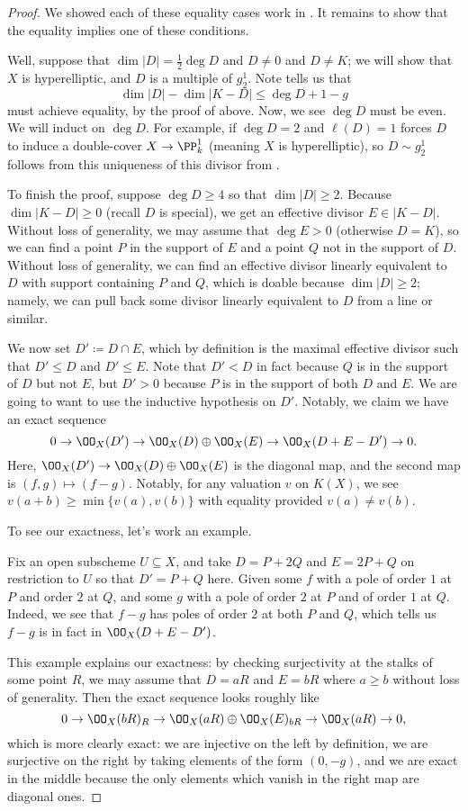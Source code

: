\documentclass[../notes.tex]{subfiles}
\begin{document}
\begin{proof}
	We showed each of these equality cases work in . It remains to show that the equality implies one of these conditions.

	Well, suppose that $\dim|D|=\frac12\deg D$ and $D\ne0$ and $D\ne K$; we will show that $X$ is hyperelliptic, and $D$ is a multiple of $g^1_2$. Note  tells us that
	\[\dim|D|-\dim|K-D|\le\deg D+1-g\]
	must achieve equality, by the proof of  above. Now, we see $\deg D$ must be even. We will induct on $\deg D$. For example, if $\deg D=2$ and $\ell(D)=1$ forces $D$ to induce a double-cover $X\to\PP^1_k$ (meaning $X$ is hyperelliptic), so $D\sim g^1_2$ follows from this uniqueness of this divisor from .

	To finish the proof, suppose $\deg D\ge4$ so that $\dim|D|\ge2$. Because $\dim|K-D|\ge0$ (recall $D$ is special), we get an effective divisor $E\in|K-D|$. Without loss of generality, we may assume that $\deg E>0$ (otherwise $D=K$), so we can find a point $P$ in the support of $E$ and a point $Q$ not in the support of $D$. Without loss of generality, we can find an effective divisor linearly equivalent to $D$ with support containing $P$ and $Q$, which is doable because $\dim|D|\ge2$; namely, we can pull back some divisor linearly equivalent to $D$ from a line or similar.

	We now set $D'\coloneqq D\cap E$, which by definition is the maximal effective divisor such that $D'\le D$ and $D'\le E$. Note that $D'<D$ in fact because $Q$ is in the support of $D$ but not $E$, but $D'>0$ because $P$ is in the support of both $D$ and $E$. We are going to want to use the inductive hypothesis on $D'$. Notably, we claim we have an exact sequence
	\[0\to\OO_X(D')\to\OO_X(D)\oplus\OO_X(E)\to\OO_X(D+E-D')\to0.\]
	Here, $\OO_X(D')\to\OO_X(D)\oplus\OO_X(E)$ is the diagonal map, and the second map is $(f,g)\mapsto(f-g)$. Notably, for any valuation $v$ on $K(X)$, we see $v(a+b)\ge\min\{v(a),v(b)\}$ with equality provided $v(a)\ne v(b)$.

	To see our exactness, let's work an example.
	\begin{example}
		Fix an open subscheme $U\subseteq X$, and take $D=P+2Q$ and $E=2P+Q$ on restriction to $U$ so that $D'=P+Q$ here. Given some $f$ with a pole of order $1$ at $P$ and order $2$ at $Q$, and some $g$ with a pole of order $2$ at $P$ and of order $1$ at $Q$. Indeed, we see that $f-g$ has poles of order $2$ at both $P$ and $Q$, which tells us $f-g$ is in fact in $\OO_X(D+E-D')$.
	\end{example}
	This example explains our exactness: by checking surjectivity at the stalks of some point $R$, we may assume that $D=aR$ and $E=bR$ where $a\ge b$ without loss of generality. Then the exact sequence looks roughly like
	\[0\to\OO_X(bR)_R\to\OO_X(aR)\oplus\OO_X(E)_{bR}\to\OO_X(aR)\to0,\]
	which is more clearly exact: we are injective on the left by definition, we are surjective on the right by taking elements of the form $(0,-g)$, and we are exact in the middle because the only elements which vanish in the right map are diagonal ones.


\end{proof}
\end{document}
